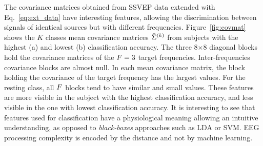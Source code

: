 The covariance matrices obtained from SSVEP data extended with Eq.~\eqref{eq:ext_data} have interesting features, allowing the discrimination between signals of identical sources but with different frequencies. 
Figure~\ref{fig:covmat} shows the $K$ classes mean covariance matrices $\bar{\Sigma}^{(k)}$ from subjects with the highest (a) and lowest (b) classification accuracy. 
The three 8$\times$8 diagonal blocks hold the covariance matrices of the $F=3$ target frequencies.
Inter-frequencies covariance blocks are almost null.
In each mean covariance matrix, the block holding the covariance of the target frequency has the largest values. 
For the resting class, all $F$ blocks tend to have similar and small values. These features are more visible in the subject with the highest classification accuracy, and less visible in the one with lowest classification accuracy. 
It is interesting to see that features used for classification have a physiological meaning allowing an intuitive understanding, as opposed to \emph{black-boxes} approaches such as LDA or SVM. EEG processing complexity is encoded by the distance and not by machine learning.

